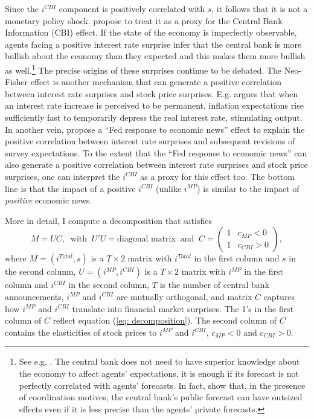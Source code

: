 \documentclass[a4paper,12pt]{article}
\begin{document}
Since the $i^{CBI}$ component is positively correlated with $s$, it follows that it is not a monetary policy shock.
\cite{Jarocinski_Karadi_2020} propose to treat it as a proxy for the Central Bank Information (CBI) effect.
If the state of the economy is imperfectly observable, agents facing a positive interest rate surprise
infer that the central bank is more bullish about the economy than they expected 
and this makes them more bullish as well.\footnote{See e.g. \cite{Romer_Romer_2000,Melosi_2017,Nakamura_Steinsson_2018}.
The central bank does not need to have superior knowledge about the economy to affect
agents' expectations, it is enough if its forecast is not perfectly correlated with agents' forecasts. In fact, \cite{Morris_Shin_2002} show that, in the presence of coordination motives,
the central bank's public forecast can have outsized effects even if it is less precise than the agents' private forecasts.}
The precise origins of these surprises continue to be debated.
The Neo-Fisher effect is another mechanism that can generate a positive correlation
between interest rate surprises and stock price surprises.
E.g. \cite{Uribe_2022} argues that when an interest rate increase is perceived to be permanent,
inflation expectations rise sufficiently fast to temporarily depress the real interest rate,
stimulating output. In another vein, \cite{Bauer_Swanson_2020} propose
a ``Fed response to economic news'' effect to explain the positive correlation between interest rate surprises and subsequent revisions of survey expectations. 
To the extent that the ``Fed response to economic news'' can also generate
a positive correlation between interest rate surprises and stock price surprises, 
one can interpret the $i^{CBI}$ as a proxy for this effect too.
The bottom line is that the impact of a positive $i^{CBI}$ (unlike $i^{MP}$) is similar to the impact of \emph{positive} economic news.

More in detail, I compute a decomposition that satisfies
\begin{equation}\label{eq: rotational}
M = UC,\;\;\text{with}\;\;  U'U=\text{diagonal matrix} \;\; \text{and}\;\;
C=\begin{pmatrix}1&c_{MP}<0\\1&c_{CBI}>0\end{pmatrix},
\end{equation}
where $M=(i^{Total},s)$ is a $T \times 2$ matrix with $i^{Total}$ in the first column and $s$ in the second column,
$U=\left(i^{MP},i^{CBI}\right)$ is a $T \times 2$ matrix with $i^{MP}$ in the first column and $i^{CBI}$ in the second column, $T$ is the number of central bank announcements,
$i^{MP}$ and $i^{CBI}$ are mutually orthogonal, and matrix $C$ captures how $i^{MP}$ and $i^{CBI}$ translate
into financial market surprises. The 1's in the first column of $C$ reflect equation (\ref{eq: decomposition}).
The second column of $C$ contains the elasticities of stock prices to $i^{MP}$ and $i^{CBI}$, $c_{MP}<0$ and $c_{CBI}>0$.
\end{document}
